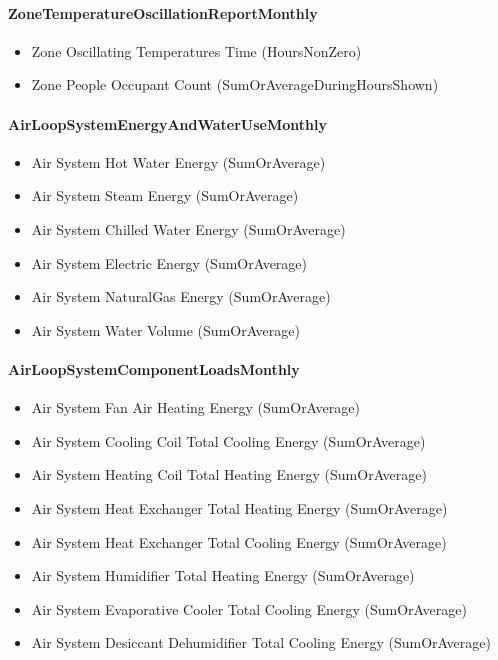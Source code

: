 \paragraph{ZoneTemperatureOscillationReportMonthly}\label{zonetemperatureoscillationreportmonthly}

\begin{itemize}
\item
  Zone Oscillating Temperatures Time (HoursNonZero)
\item
  Zone People Occupant Count (SumOrAverageDuringHoursShown)
\end{itemize}

\paragraph{AirLoopSystemEnergyAndWaterUseMonthly}\label{airloopsystemenergyandwaterusemonthly}

\begin{itemize}
\item
  Air System Hot Water Energy (SumOrAverage)
\item
  Air System Steam Energy (SumOrAverage)
\item
  Air System Chilled Water Energy (SumOrAverage)
\item
  Air System Electric Energy (SumOrAverage)
\item
  Air System NaturalGas Energy (SumOrAverage)
\item
  Air System Water Volume (SumOrAverage)
\end{itemize}

\paragraph{AirLoopSystemComponentLoadsMonthly}\label{airloopsystemcomponentloadsmonthly}

\begin{itemize}
\item
  Air System Fan Air Heating Energy (SumOrAverage)
\item
  Air System Cooling Coil Total Cooling Energy (SumOrAverage)
\item
  Air System Heating Coil Total Heating Energy (SumOrAverage)
\item
  Air System Heat Exchanger Total Heating Energy (SumOrAverage)
\item
  Air System Heat Exchanger Total Cooling Energy (SumOrAverage)
\item
  Air System Humidifier Total Heating Energy (SumOrAverage)
\item
  Air System Evaporative Cooler Total Cooling Energy (SumOrAverage)
\item
  Air System Desiccant Dehumidifier Total Cooling Energy (SumOrAverage)
\end{itemize}

